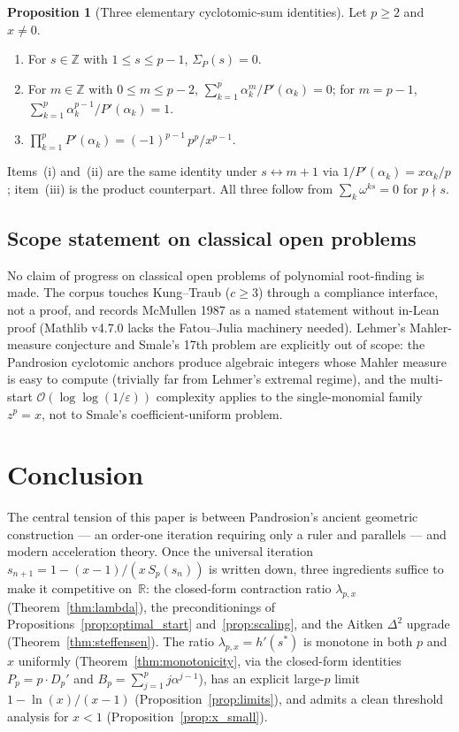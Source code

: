 \documentclass[11pt,a4paper]{article}
\theoremstyle{definition}
\newtheorem{proposition}{Proposition}[section]
\begin{document}
\begin{proposition}[Three elementary cyclotomic-sum identities]\label{thm:zeta-all}
Let $p \geq 2$ and $x \neq 0$.
\begin{enumerate}
  \item[(i)] For $s \in \mathbb{Z}$ with $1 \leq s \leq p-1$, $\Sigma_P(s) = 0$.
  \item[(ii)] For $m \in \mathbb{Z}$ with $0 \leq m \leq p-2$, $\sum_{k=1}^p \alpha_k^m/P'(\alpha_k) = 0$; for $m = p-1$, $\sum_{k=1}^p \alpha_k^{p-1}/P'(\alpha_k) = 1$.
  \item[(iii)] $\prod_{k=1}^p P'(\alpha_k) = (-1)^{p-1}\,p^p/x^{p-1}$.
\end{enumerate}
Items~(i) and~(ii) are the same identity under $s \leftrightarrow m+1$ via $1/P'(\alpha_k) = x\alpha_k/p$; item~(iii) is the product counterpart. All three follow from $\sum_k \omega^{ks} = 0$ for $p \nmid s$.
\end{proposition}

\subsection{Scope statement on classical open problems}

No claim of progress on classical open problems of polynomial root-finding is made. The corpus touches Kung--Traub ($c \geq 3$) through a compliance interface, not a proof, and records McMullen 1987 as a named statement without in-Lean proof (Mathlib v4.7.0 lacks the Fatou--Julia machinery needed). Lehmer's Mahler-measure conjecture and Smale's 17th problem are explicitly out of scope: the Pandrosion cyclotomic anchors produce algebraic integers whose Mahler measure is easy to compute (trivially far from Lehmer's extremal regime), and the multi-start $\mathcal{O}(\log\log(1/\varepsilon))$ complexity applies to the single-monomial family $z^p = x$, not to Smale's coefficient-uniform problem.

\section{Conclusion}
\label{sec:conclusion}

The central tension of this paper is between Pandrosion's ancient geometric construction --- an order-one iteration requiring only a ruler and parallels --- and modern acceleration theory. Once the universal iteration $s_{n+1} = 1 - (x-1)/(x\,S_p(s_n))$ is written down, three ingredients suffice to make it competitive on~$\mathbb{R}$: the closed-form contraction ratio $\lambda_{p,x}$ (Theorem~\ref{thm:lambda}), the preconditionings of Propositions~\ref{prop:optimal_start} and~\ref{prop:scaling}, and the Aitken $\Delta^2$ upgrade (Theorem~\ref{thm:steffensen}). The ratio $\lambda_{p,x} = h'(s^*)$ is monotone in both $p$ and $x$ uniformly (Theorem~\ref{thm:monotonicity}, via the closed-form identities $P_p = p \cdot D_p'$ and $B_p = \sum_{j=1}^{p} j\alpha^{j-1}$), has an explicit large-$p$ limit $1 - \ln(x)/(x-1)$ (Proposition~\ref{prop:limits}), and admits a clean threshold analysis for $x < 1$ (Proposition~\ref{prop:x_small}).
\end{document}
